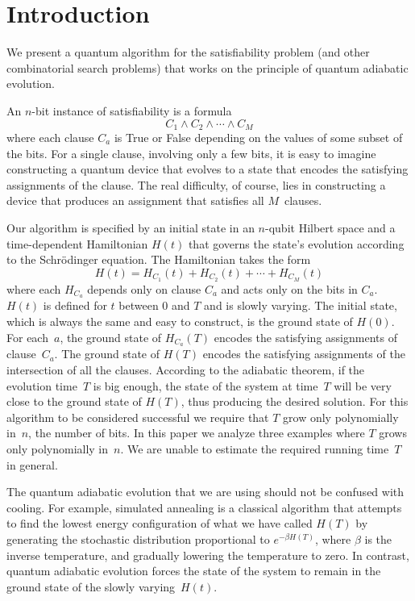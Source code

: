 \documentclass[twoside]{article}
\newcommand{\numEq}[2]{\begin{equation}
   \label{eq:#1}
   #2\end{equation}}
\numberwithin{equation}{section}
\begin{document}
\section{Introduction}\label{sec:0}  We present a quantum algorithm for
the satisfiability problem (and other combinatorial search problems) that
works on the principle of quantum adiabatic evolution.  

An $n$-bit instance of satisfiability is a formula
\numEq{0.1}{ C_1 \wedge C_2  \wedge \cdots \wedge C_M  }  where each
clause $C_a$ is True or False depending on the values of some subset of the
bits. For a single clause, involving only a few bits, it is easy to imagine
constructing a quantum device that evolves to a state that encodes the
satisfying assignments of the clause. The real difficulty, of course, lies in
constructing a device that produces an assignment that satisfies all
$M$~clauses. 

Our algorithm is specified by an initial state in an $n$-qubit Hilbert space
and a time-dependent Hamiltonian $H(t)$ that governs the state's evolution
according to the Schr\"odinger equation. The Hamiltonian takes the form
\numEq{0.2}{ H(t) = H_{C_1}(t) + H_{C_2}(t) + \cdots + H_{C_M}(t) } where
each $H_{C_a}$ depends only on clause $C_a$ and acts only on the bits in
$C_a$. $H(t)$ is defined for $t$ between $0$ and $T$ and is slowly varying.
The initial state, which is always the same and easy to construct, is the
ground state of $H(0)$. For each~$a$, the ground state of $H_{C_a}(T)$
encodes the satisfying assignments of clause~$C_a$. The ground state of
$H(T)$ encodes the satisfying assignments of the intersection of all the
clauses. According to the adiabatic theorem, if the evolution time~$T$ is big
enough, the state of the system at time~$T$ will be very close to the ground
state of $H(T)$, thus producing the desired solution. For this algorithm to be
considered successful we require that $T$ grow only polynomially in~$n$,
the number of bits. In this paper we analyze three examples where $T$
grows only polynomially in~$n$. We are unable to estimate the required
running time~$T$ in general.

The quantum adiabatic evolution that we are using should not be confused
with cooling. For example, simulated annealing is a classical algorithm that
attempts to find the lowest energy configuration of what we have called
$H(T)$ by generating the stochastic distribution proportional to 
$e^{-\beta H(T)}$, where $\beta$ is the inverse temperature, and gradually
lowering the temperature to zero. In contrast,  quantum adiabatic
evolution forces the state of the system to remain in the ground state of the
slowly varying~$H(t)$. 
\end{document}
